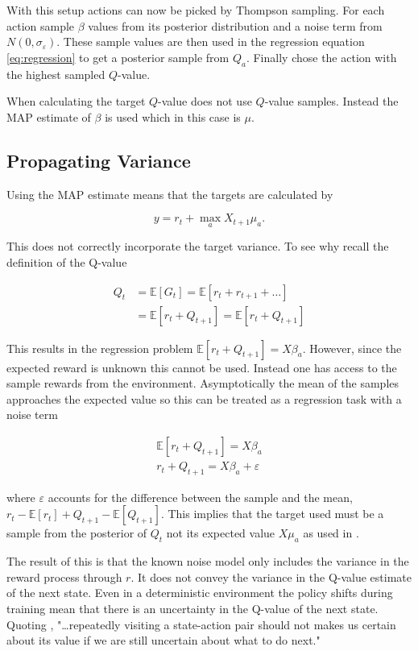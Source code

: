 With this setup actions can now be picked by Thompson sampling. For each action sample $\beta$ values from its posterior distribution and a noise term from $N(0, \sigma_\varepsilon)$. These sample values are then used in the regression equation \ref{eq:regression} to get a posterior sample from $Q_a$. Finally chose the action with the highest sampled $Q$-value. 

When calculating the target $Q$-value \cite{azziz_2018} does not use $Q$-value samples. Instead the MAP estimate of $\beta$ is used which in this case is $\mu$.


\subsection{Propagating Variance}

Using the MAP estimate means that the targets are calculated by 

$$
y = r_t + \max_a X_{t+1}\mu_a.
$$

This does not correctly incorporate the target variance. To see why recall the definition of the Q-value

\begin{align*}
    Q_t &= \mathbb{E}[G_t] = \mathbb{E}[r_t + r_{t+1} + \dots] \\
    &= \mathbb{E}[r_t + Q_{t+1}] = \mathbb{E}[r_t + Q_{t+1}]
\end{align*}

This results in the regression problem $\mathbb{E}[r_t + Q_{t+1}] = X\beta_a$. However, since the expected reward is unknown this cannot be used. Instead one has access to the sample rewards from the environment. Asymptotically the mean of the samples approaches the expected value so this can be treated as a regression task with a noise term

\begin{align*}
    \mathbb{E}[r_t + Q_{t+1}] = X\beta_a \\
    r_t + Q_{t+1} = X\beta_a + \varepsilon
\end{align*}

where $\varepsilon$ accounts for the difference between the sample and the mean, $r_t - \mathbb{E}[r_t] + Q_{t+1} - \mathbb{E}[Q_{t+1}]$. This implies that the target used must be a sample from the posterior of $Q_t$ not its expected value $X\mu_a$ as used in \cite{azziz_2018}. 

The result of this is that the known noise model only includes the variance in the reward process through $r$. It does not convey the variance in the Q-value estimate of the next state. Even in a deterministic environment the policy shifts during training mean that there is an uncertainty in the Q-value of the next state. Quoting \cite{moerland_2017},  "\dots repeatedly visiting a state-action pair should not makes us certain about its value if we are still uncertain about what to do next."

